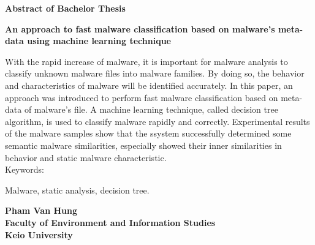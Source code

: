 \begin{center}


\begin{Large}
{\bf Abstract of Bachelor Thesis} \\

\vspace{5mm}

{\bf An approach to fast malware classification based on malware's meta-data using machine learning technique}
\end{Large}
\end{center}

\vspace{0.8cm}
 
  With the rapid increase of malware, it is important for malware analysis to classify unknown malware files into malware families. By doing so, the behavior and characteristics of malware will be identified accurately. In this paper, an approach was introduced to perform fast malware classification based on meta-data of malware's file. A machine learning technique, called decision tree algorithm, is used to classify malware rapidly and correctly. Experimental results of the malware samples show that the ssystem successfully determined some semantic malware similarities, especially showed their inner similarities in behavior and static malware characteristic.  \\

Keywords:

Malware, static analysis, decision tree.

\vspace{0.5cm}

\begin{flushright}
{\bf Pham Van Hung}\\
\vspace{2mm}
{\bf Faculty of Environment and Information Studies}\\
{\bf Keio University}\\
\end{flushright}